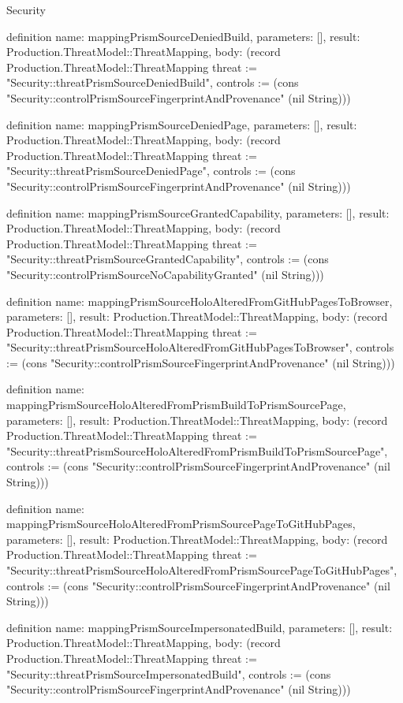 \begin{lexlean}{Security}
\begin{semanticmodule}
definition{
  name: mappingPrismSourceDeniedBuild,
  parameters: [],
  result: Production.ThreatModel::ThreatMapping,
  body: (record Production.ThreatModel::ThreatMapping {threat := "Security::threatPrismSourceDeniedBuild", controls := (cons "Security::controlPrismSourceFingerprintAndProvenance" (nil String))})
}

definition{
  name: mappingPrismSourceDeniedPage,
  parameters: [],
  result: Production.ThreatModel::ThreatMapping,
  body: (record Production.ThreatModel::ThreatMapping {threat := "Security::threatPrismSourceDeniedPage", controls := (cons "Security::controlPrismSourceFingerprintAndProvenance" (nil String))})
}

definition{
  name: mappingPrismSourceGrantedCapability,
  parameters: [],
  result: Production.ThreatModel::ThreatMapping,
  body: (record Production.ThreatModel::ThreatMapping {threat := "Security::threatPrismSourceGrantedCapability", controls := (cons "Security::controlPrismSourceNoCapabilityGranted" (nil String))})
}

definition{
  name: mappingPrismSourceHoloAlteredFromGitHubPagesToBrowser,
  parameters: [],
  result: Production.ThreatModel::ThreatMapping,
  body: (record Production.ThreatModel::ThreatMapping {threat := "Security::threatPrismSourceHoloAlteredFromGitHubPagesToBrowser", controls := (cons "Security::controlPrismSourceFingerprintAndProvenance" (nil String))})
}

definition{
  name: mappingPrismSourceHoloAlteredFromPrismBuildToPrismSourcePage,
  parameters: [],
  result: Production.ThreatModel::ThreatMapping,
  body: (record Production.ThreatModel::ThreatMapping {threat := "Security::threatPrismSourceHoloAlteredFromPrismBuildToPrismSourcePage", controls := (cons "Security::controlPrismSourceFingerprintAndProvenance" (nil String))})
}

definition{
  name: mappingPrismSourceHoloAlteredFromPrismSourcePageToGitHubPages,
  parameters: [],
  result: Production.ThreatModel::ThreatMapping,
  body: (record Production.ThreatModel::ThreatMapping {threat := "Security::threatPrismSourceHoloAlteredFromPrismSourcePageToGitHubPages", controls := (cons "Security::controlPrismSourceFingerprintAndProvenance" (nil String))})
}

definition{
  name: mappingPrismSourceImpersonatedBuild,
  parameters: [],
  result: Production.ThreatModel::ThreatMapping,
  body: (record Production.ThreatModel::ThreatMapping {threat := "Security::threatPrismSourceImpersonatedBuild", controls := (cons "Security::controlPrismSourceFingerprintAndProvenance" (nil String))})
}


\end{semanticmodule}
\end{lexlean}
